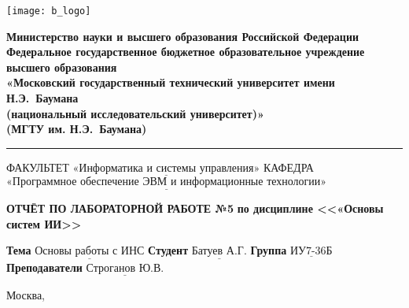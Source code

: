 \thispagestyle{empty}

\noindent \begin{minipage}{0.15\textwidth}
	\texttt{[image: b\_logo]}
\end{minipage}
\noindent\begin{minipage}{0.85\textwidth}\centering
	\textbf{Министерство науки и высшего образования Российской Федерации}\\
	\textbf{Федеральное государственное бюджетное образовательное учреждение высшего образования}\\
	\textbf{«Московский государственный технический университет имени Н.Э.~Баумана}\\
	\textbf{(национальный исследовательский университет)»}\\
	\textbf{(МГТУ им. Н.Э.~Баумана)}
\end{minipage}

\noindent\rule{\linewidth}{3pt}
\newline\newline
\noindent ФАКУЛЬТЕТ $\underline{\text{«Информатика и системы управления»}}$ \newline\newline
\noindent КАФЕДРА $\underline{\text{«Программное обеспечение ЭВМ и информационные технологии»}}$

\vspace{1cm}

\begin{center}
	\noindent\begin{minipage}{1.3\textwidth}\centering
		\Large\textbf{ОТЧЁТ ПО ЛАБОРАТОРНОЙ РАБОТЕ №5}\newline
		\textbf{по дисциплине <<«Основы систем ИИ>>}\newline\newline
	\end{minipage}
\end{center}

\noindent\textbf{Тема} $\underline{\text{Основы работы с ИНС}}$\newline\newline
\noindent\textbf{Студент} $\underline{\text{Батуев А.Г.}}$\newline\newline
\noindent\textbf{Группа} $\underline{\text{ИУ7-36Б}}$\newline\newline
\noindent\textbf{Преподаватели} $\underline{\text{Строганов Ю.В.}}$\newline

\begin{center}
	\vfill
	Москва,~\the\year
\end{center}
\clearpage
